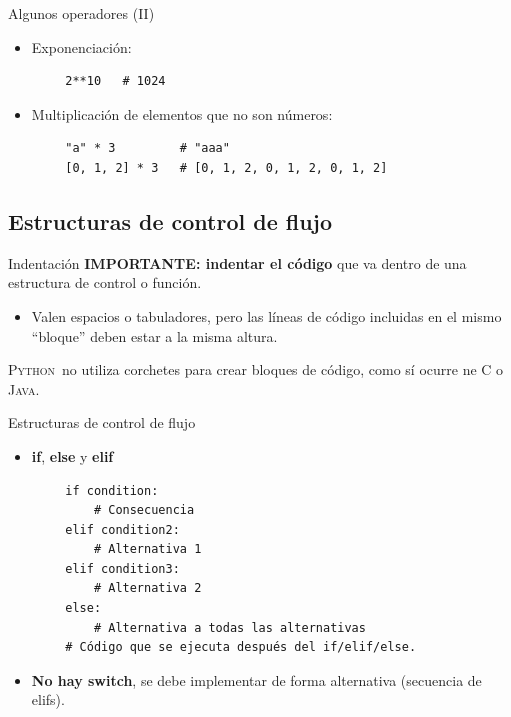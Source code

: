 \documentclass[10pt]{beamer} %
\newcommand{\py}{\textsc{Python}}
\begin{document}
\begin{frame}[fragile]{Algunos operadores (II)}
    \begin{itemize}
        \item Exponenciación:
    \end{itemize}
    \begin{verbatim}
        2**10   # 1024
    \end{verbatim}
    \begin{itemize}
        \item Multiplicación de elementos que no son números:
    \end{itemize}
    \begin{verbatim}
        "a" * 3         # "aaa"
        [0, 1, 2] * 3   # [0, 1, 2, 0, 1, 2, 0, 1, 2]
    \end{verbatim}
\end{frame}

\subsection{Estructuras de control de flujo}
\begin{frame}{Indentación}
    \textbf{IMPORTANTE: indentar el código} que va dentro de una estructura de control o función.
    \begin{itemize}
        \item Valen espacios o tabuladores, pero las líneas de código incluidas en el mismo ``bloque'' deben estar a la misma altura.
    \end{itemize}\par
    \py\, no utiliza corchetes para crear bloques de código, como sí ocurre ne \textsc{C} o \textsc{Java}.
\end{frame}

\begin{frame}[fragile]{Estructuras de control de flujo}
    \begin{itemize}
        \item \textbf{if}, \textbf{else} y \textbf{elif}
    \end{itemize}
    \begin{verbatim}
        if condition:
            # Consecuencia
        elif condition2:
            # Alternativa 1
        elif condition3:
            # Alternativa 2
        else:
            # Alternativa a todas las alternativas
        # Código que se ejecuta después del if/elif/else.
    \end{verbatim}
    \begin{itemize}
        \item \textbf{No hay switch}, se debe implementar de forma alternativa (secuencia de elifs).
    \end{itemize}
\end{frame}
\end{document}
